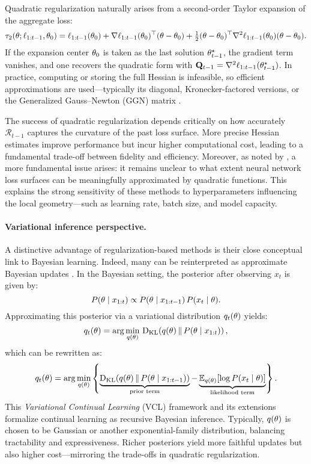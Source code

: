 \documentclass[10pt]{article} %
\begin{document}
Quadratic regularization naturally arises from a second-order Taylor expansion of the aggregate loss:
\[
\tau_2(\theta; \ell_{1:t-1}, \theta_0)
    = \ell_{1:t-1}(\theta_0)
    + \nabla\ell_{1:t-1}(\theta_0)^\top (\theta - \theta_0)
    + \tfrac{1}{2}(\theta - \theta_0)^\top \nabla^2\ell_{1:t-1}(\theta_0) (\theta - \theta_0).
\]
If the expansion center $\theta_0$ is taken as the last solution $\theta_{t-1}^\star$, the gradient term vanishes, and one recovers the quadratic form with $\mathbf{Q}_{t-1} = \nabla^2\ell_{1:t-1}(\theta_{t-1}^\star)$.  
In practice, computing or storing the full Hessian is infeasible, so efficient approximations are used—typically its diagonal, Kronecker-factored versions, or the Generalized Gauss–Newton (GGN) matrix \citep{ritterOnlineStructuredLaplace2018,yinOptimizationGeneralizationRegularizationbased2020,kirkpatrickOvercomingCatastrophicForgetting2017}.

The success of quadratic regularization depends critically on how accurately $\mathcal{R}_{t-1}$ captures the curvature of the past loss surface.  
More precise Hessian estimates improve performance but incur higher computational cost, leading to a fundamental trade-off between fidelity and efficiency.  
Moreover, as noted by \citet{lanzillottaLocalVsGlobal2024}, a more fundamental issue arises: it remains unclear to what extent neural network loss surfaces can be meaningfully approximated by quadratic functions.
This explains the strong sensitivity of these methods to hyperparameters influencing the local geometry—such as learning rate, batch size, and model capacity.

\paragraph{Variational inference perspective.}
A distinctive advantage of regularization-based methods is their close conceptual link to Bayesian learning.  
Indeed, many can be reinterpreted as approximate Bayesian updates \citep{opperBayesianApproachOnline1999,khanBayesianLearningRule2024}.  
In the Bayesian setting, the posterior after observing $x_t$ is given by:
\[
P(\theta \mid x_{1:t}) \propto P(\theta \mid x_{1:t-1})\, P(x_t \mid \theta).
\]
Approximating this posterior via a variational distribution $q_t(\theta)$ yields:
\[
q_t(\theta) = 
\arg\min_{q(\theta)} \, \mathrm{D_{KL}}\!\left(q(\theta) \,\|\, P(\theta \mid x_{1:t})\right),
\]
which can be rewritten as:
\[
q_t(\theta) = 
\arg\min_{q(\theta)} 
\left\{
\underbrace{\mathrm{D_{KL}}\!\left(q(\theta) \,\|\, P(\theta \mid x_{1:t-1})\right)}_{\text{prior term}}
- \underbrace{\mathbb{E}_{q(\theta)}[\log P(x_t \mid \theta)]}_{\text{likelihood term}}
\right\}.
\]
This \emph{Variational Continual Learning} (VCL) framework \citep{nguyenVariationalContinualLearning2018} and its extensions \citep{swaroopImprovingUnderstandingVariational2019,looGeneralizedVariationalContinual2020,tseranNaturalVariationalContinual2018} formalize continual learning as recursive Bayesian inference.  
Typically, $q(\theta)$ is chosen to be Gaussian or another exponential-family distribution, balancing tractability and expressiveness.  
Richer posteriors yield more faithful updates but also higher cost—mirroring the trade-offs in quadratic regularization.
\end{document}
